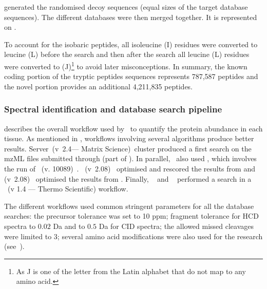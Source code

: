  generated the randomised
decoy sequences (equal sizes of the target database sequences).
The different databases were then merged together.
It is represented on .\mybr\

To account for the isobaric peptides, all isoleucine (I) residues were
converted to leucine (L) before the search and then after the search all leucine
(L) residues were converted to (J)\footnote{As J is one of the letter
from the Latin alphabet that do not map to any amino acid.}
to avoid later misconceptions.
In summary, the known coding portion of the tryptic peptides sequences represents
787,587 peptides and the novel portion provides an additional 4,211,835 peptides.\mybr\


\subsubsection{Spectral identification and database search pipeline}%
\label{subsub:spectralIDDBsearch}

 describes the overall workflow used by
\james\ to quantify the protein abundance in each tissue. As mentioned in
, workflows involving several algorithms produce
better results.  Server~(v~2.4--- Matrix Science)~cluster produced
a first search on the mzML files submitted through 
(part of ). In parallel, \james\ also used  ,
which involves the run of ~(v. 10089)~.
~(v~2.08)~
optimised and rescored the results from  and
 (v~2.08)~ optimised
the results from .
Finally, ~ and
~ performed a search in a
~(v 1.4 --- Thermo Scientific) workflow.\mybr\

The different workflows used common stringent parameters for all the database
searches:
the precursor tolerance was set to 10 \gls{ppm};
fragment tolerance for \gls{HCD} spectra to $0.02$ \gls{Da} and
to $0.5$ \gls{Da} for \gls{CID} spectra;
the allowed missed cleavages were limited to $3$;
several amino acid modifications were
also used for the research (see~\citet{Wright-2016}).\mybr\

